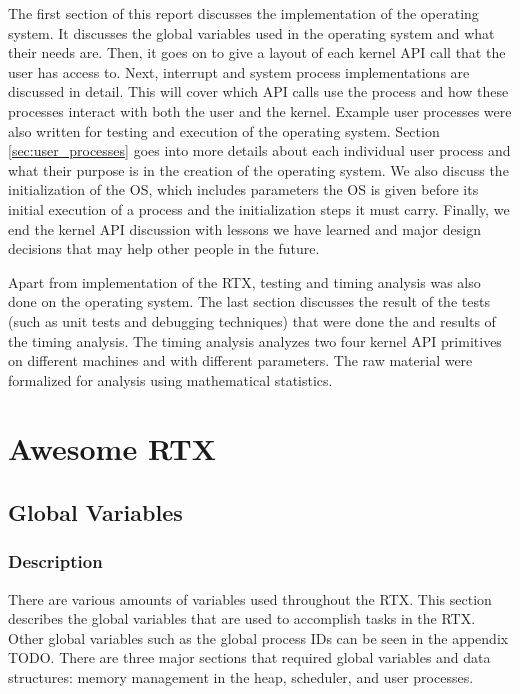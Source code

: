 \documentclass[12pt]{report}
\begin{document}
The first section of this report discusses the implementation of the operating system. It discusses the global variables used in the operating system and what their needs are. Then, it goes on to give a layout of each kernel API call that the user has access to. Next, interrupt and system process implementations are discussed in detail. This will cover which API calls use the process and how these processes interact with both the user and the kernel. Example user processes were also written for testing and execution of the operating system. Section \ref{sec:user_processes} goes into more details about each individual user process and what their purpose is in the creation of the operating system. We also discuss the initialization of the OS, which includes parameters the OS is given before its initial execution of a process and the initialization steps it must carry. Finally, we end the kernel API discussion with lessons we have learned and major design decisions that may help other people in the future.

Apart from implementation of the RTX, testing and timing analysis was also done on the operating system. The last section discusses the result of the tests (such as unit tests and debugging techniques) that were done the and results of the timing analysis. The timing analysis analyzes two four kernel API primitives on different machines and with different parameters. The raw material were formalized for analysis using mathematical statistics.



\part{Awesome RTX}

\chapter{Global Variables}
\section{Description}
There are various amounts of variables used throughout the RTX. This section describes the global variables that are used to accomplish tasks in the RTX. Other global variables such as the global process IDs can be seen in the appendix TODO. There are three major sections that required global variables and data structures: memory management in the heap, scheduler, and user processes.
\end{document}
